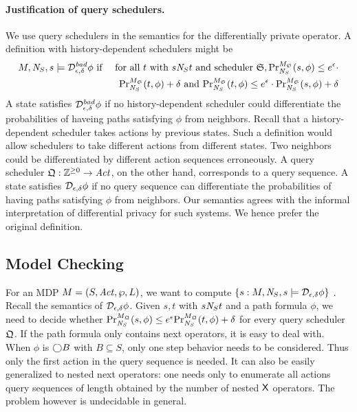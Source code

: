 \paragraph{Justification of query schedulers.}
We use query schedulers in the semantics for the differentially
private operator. A definition with history-dependent schedulers
might be
\begin{eqnarray*}
  M, \neighbor{S}, s \models \dpriv{\epsilon}{\delta}^{\mathit{bad}} \phi
  & \textmd{ if } &
  \textmd{for all } t \textmd{ with } s \neighbor{S} t \textmd{ and
  scheduler } \scheduler{S},
  \myPr{s}{M_{\scheduler{S}}}{\neighbor{S}}{\phi} \leq
  e^{\epsilon} \cdot\\
  && \myPr{t}{M_{\scheduler{S}}}{\neighbor{S}}{\phi} + \delta \textmd{ and }
  \myPr{t}{M_{\scheduler{S}}}{\neighbor{S}}{\phi} \leq
  e^{\epsilon} \cdot \myPr{s}{M_{\scheduler{S}}}{\neighbor{S}}{\phi}
  + \delta
\end{eqnarray*}
A state satisfies $\dpriv{\epsilon}{\delta}^{\mathit{bad}} \phi$ if
no history-dependent scheduler could differentiate the probabilities
of haveing paths satisfying
$\phi$ from neighbors. Recall that a history-dependent scheduler takes
actions by previous states. Such a definition would allow
schedulers to take different actions from different states. 
Two neighbors could be differentiated by different action sequences
erroneously.
A query scheduler $\scheduler{Q} : \bbfZ^{\geq 0} \rightarrow \Act$,
on the other hand, corresponds to a query sequence. A state satisfies
$\dpriv{\epsilon}{\delta} \phi$ if no query sequence can differentiate
the probabilities of having paths satisfying $\phi$ from neighbors.
Our semantics agrees with the informal interpretation of differential
privacy for such systems. We hence
prefer the original definition.

\subsection{Model Checking}
For an MDP $M =
(S, \Act, \wp, L)$, we want to compute $\{ s : M, \neighbor{S}, s \models
\dpriv{\epsilon}{\delta} \phi \}$ . Recall the semantics of $\dpriv{\epsilon}{\delta}
\phi$. Given $s, t$ with $s \neighbor{S} t$ and a path formula
$\phi$, we need to decide whether
$\myPr{s}{M_{\scheduler{Q}}}{\neighbor{S}}{\phi} \leq
e^{\epsilon} \myPr{t}{M_{\scheduler{Q}}}{\neighbor{S}}{\phi} + \delta$
for every query scheduler $\scheduler{Q}$.
If the path formula only contains next operators, it is easy to deal with. When $\phi$ is $\gX B$ with $B\subseteq S$, only one step behavior needs to be considered. Thus only the first action in the query sequence is needed. It can also be easily generalized to nested next operators:  one needs only to enumerate
all actions query sequences of length obtained by the number of nested $\X$ operators.
The problem however is undecidable in general.

